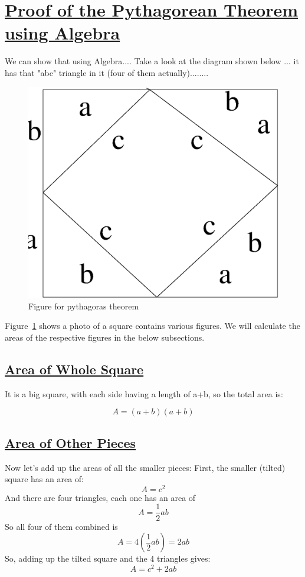 \documentclass[10pt]{article}
\begin{document}
\section{\underline{Proof of the Pythagorean Theorem using Algebra}}
\label{sec:proof}

We can show that using Algebra....\newline
Take a look at the diagram shown below ... it has that "abc" triangle in it (four of them actually)........

\begin{figure}[htb!]
  \begin{center}
    \includegraphics[width=0.5\columnwidth]{fig9.eps}
   \end{center}
  \caption{Figure for pythagoras theorem}
  \label{image1}
\end{figure}
Figure~\ref{image1} shows a photo of a square contains various figures. We will calculate the areas of the respective figures in the below subsections.


\subsection{\underline{Area of Whole Square}}
\label{a_square}

It is a big square, with each side having a length of a+b, so the total area is:

$$A = (a+b)(a+b)$$

\subsection{\underline{Area of Other Pieces}}
\label{a_pieces}

Now let's add up the areas of all the smaller pieces:\newline
First, the smaller (tilted) square has an area of:
\begin{equation}
\label{two}
A = c^2 
\end{equation} 
And there are four triangles, each one has an area of 
\begin{equation}
\label{three}
A =\frac{1}{2} ab
\end{equation}
So all four of them combined is	
\begin{equation}
\label{two}
A = 4(\frac{1}{2}ab) = 2ab
\end{equation} 
So, adding up the tilted square and the 4 triangles gives: 
\begin{equation}
\label{five}
A = c^2 +2ab
\end{equation}
\end{document}
